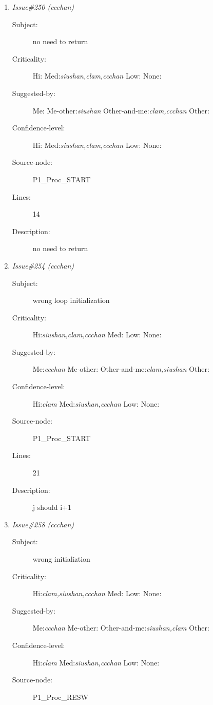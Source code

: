 \begin{enumerate}
\begin{description}
\item [Lines:] 74

\item [Description:] no reading operand
\end{description}
\item {\it Issue\#250 (ccchan)}
\begin{description}
\item [Subject:] no need to return
\item [Criticality:] Hi:{\it } Med:{\it siushan,clam,ccchan} Low:{\it } None:{\it }
\item [Suggested-by:] Me:{\it } Me-other:{\it siushan} Other-and-me:{\it clam,ccchan} Other:{\it }
\item [Confidence-level:] Hi:{\it } Med:{\it siushan,clam,ccchan} Low:{\it } None:{\it }
\item [Source-node:] P1\_Proc\_START

\item [Lines:] 14

\item [Description:] no need to return
\end{description}
\item {\it Issue\#254 (ccchan)}
\begin{description}
\item [Subject:] wrong loop initialization
\item [Criticality:] Hi:{\it siushan,clam,ccchan} Med:{\it } Low:{\it } None:{\it }
\item [Suggested-by:] Me:{\it ccchan} Me-other:{\it } Other-and-me:{\it clam,siushan} Other:{\it }
\item [Confidence-level:] Hi:{\it clam} Med:{\it siushan,ccchan} Low:{\it } None:{\it }
\item [Source-node:] P1\_Proc\_START

\item [Lines:] 21

\item [Description:] j should i+1
\end{description}
\item {\it Issue\#258 (ccchan)}
\begin{description}
\item [Subject:] wrong initializtion
\item [Criticality:] Hi:{\it clam,siushan,ccchan} Med:{\it } Low:{\it } None:{\it }
\item [Suggested-by:] Me:{\it ccchan} Me-other:{\it } Other-and-me:{\it siushan,clam} Other:{\it }
\item [Confidence-level:] Hi:{\it clam} Med:{\it siushan,ccchan} Low:{\it } None:{\it }
\item [Source-node:] P1\_Proc\_RESW


\end{description}
\end{enumerate}
